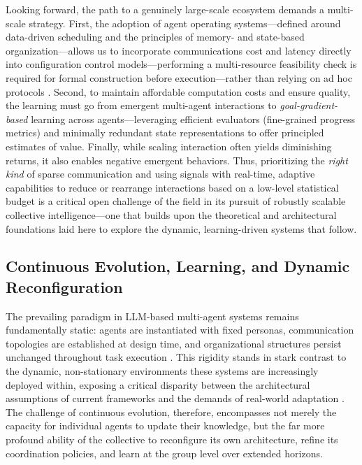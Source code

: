 \documentclass[11pt,a4paper]{article}
\begin{document}
Looking forward, the path to a genuinely large-scale ecosystem demands a multi-scale strategy. First, the adoption of agent operating systems---defined around data-driven scheduling and the principles of memory- and state-based organization---allows us to incorporate communications cost and latency directly into configuration control models---performing a multi-resource feasibility check is required for formal construction before execution---rather than relying on ad hoc protocols \cite{arxiv:2309.14365v1}. Second, to maintain affordable computation costs and ensure quality, the learning must go from emergent multi-agent interactions to \emph{goal-gradient-based} learning across agents---leveraging efficient evaluators (fine-grained progress metrics) \cite{arxiv:2401.13178v1} and minimally redundant state representations to offer principled estimates of value. Finally, while scaling interaction often yields diminishing returns, it also enables negative emergent behaviors. Thus, prioritizing the \emph{right kind} of sparse communication and using signals with real-time, adaptive capabilities to reduce or rearrange interactions based on a low-level statistical budget is a critical open challenge of the field in its pursuit of robustly scalable collective intelligence---one that builds upon the theoretical and architectural foundations laid here to explore the dynamic, learning-driven systems that follow.


\subsection{Continuous Evolution, Learning, and Dynamic Reconfiguration}


The prevailing paradigm in LLM-based multi-agent systems remains fundamentally static: agents are instantiated with fixed personas, communication topologies are established at design time, and organizational structures persist unchanged throughout task execution \cite{arxiv:2309.07864v3}. This rigidity stands in stark contrast to the dynamic, non-stationary environments these systems are increasingly deployed within, exposing a critical disparity between the architectural assumptions of current frameworks and the demands of real-world adaptation \cite{arxiv:2402.01680v2}. The challenge of continuous evolution, therefore, encompasses not merely the capacity for individual agents to update their knowledge, but the far more profound ability of the collective to reconfigure its own architecture, refine its coordination policies, and learn at the group level over extended horizons.
\end{document}
